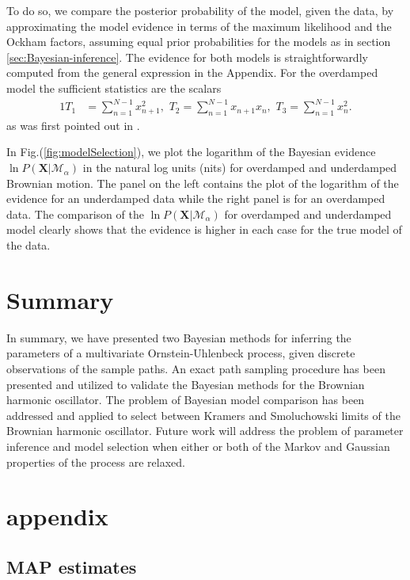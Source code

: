 \documentclass[english,aps, twocolumn, pre,superscriptaddress, notitlepage]{revtex4-1}
\begin{document}
To do so, we compare the posterior probability of the model, given
the data, by approximating the model evidence in terms of the maximum
likelihood and the Ockham factors, assuming equal prior probabilities
for the models as in section \ref{sec:Bayesian-inference}. The evidence
for both models is straightforwardly computed from the general expression
in the Appendix. For the overdamped model the sufficient statistics
are the scalars
\begin{alignat}{1}
T_{1} & =\sum_{n=1}^{N-1}x_{n+1}^{2},\,\,T_{2}=\sum_{n=1}^{N-1}x_{n+1}x_{n},\,\,T_{3}=\sum_{n=1}^{N-1}x_{n}^{2}.
\end{alignat}
as was first pointed out in \cite{bera2017fast}. 

In Fig.(\ref{fig:modelSelection}), we plot the logarithm of the Bayesian
evidence $\ln P(\boldsymbol{X}|\mathcal{M}_{\alpha})$ in the natural
log units (nits) for overdamped and underdamped Brownian motion. The
panel on the left contains the plot of the logarithm of the evidence
for an underdamped data while the right panel is for an overdamped
data. The comparison of the $\ln P(\boldsymbol{X}|\mathcal{M}_{\alpha})$
for overdamped and underdamped model clearly shows that the evidence
is higher in each case for the true model of the data. 

\section{Summary\label{sec:conclusion}}

In summary, we have presented two Bayesian methods for inferring the
parameters of a multivariate Ornstein-Uhlenbeck process, given discrete
observations of the sample paths. An exact path sampling procedure
has been presented and utilized to validate the Bayesian methods for
the Brownian harmonic oscillator. The problem of Bayesian model comparison
has been addressed and applied to select between Kramers and Smoluchowski
limits of the Brownian harmonic oscillator. Future work will address
the problem of parameter inference and model selection when either
or both of the Markov and Gaussian properties of the process are relaxed.

\widetext

\section*{appendix\label{sec:appendix}}

\subsection*{MAP estimates}
\end{document}
